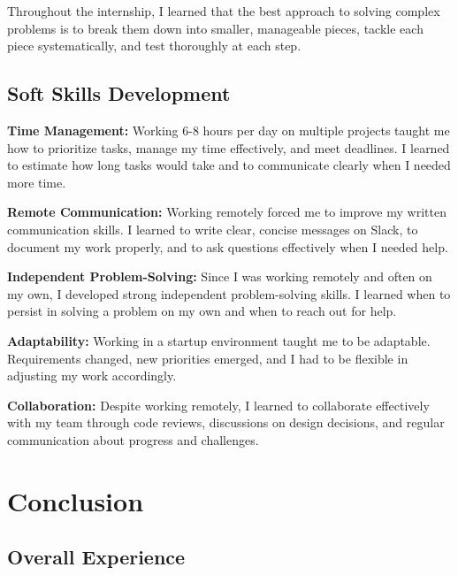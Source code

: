 \documentclass[12pt,a4paper]{report}
\begin{document}
Throughout the internship, I learned that the best approach to solving complex problems is to break them down into smaller, manageable pieces, tackle each piece systematically, and test thoroughly at each step.

\section{Soft Skills Development}

\textbf{Time Management:} Working 6-8 hours per day on multiple projects taught me how to prioritize tasks, manage my time effectively, and meet deadlines. I learned to estimate how long tasks would take and to communicate clearly when I needed more time.

\vspace{0.3cm}

\textbf{Remote Communication:} Working remotely forced me to improve my written communication skills. I learned to write clear, concise messages on Slack, to document my work properly, and to ask questions effectively when I needed help.

\vspace{0.3cm}

\textbf{Independent Problem-Solving:} Since I was working remotely and often on my own, I developed strong independent problem-solving skills. I learned when to persist in solving a problem on my own and when to reach out for help.

\vspace{0.3cm}

\textbf{Adaptability:} Working in a startup environment taught me to be adaptable. Requirements changed, new priorities emerged, and I had to be flexible in adjusting my work accordingly.

\vspace{0.3cm}

\textbf{Collaboration:} Despite working remotely, I learned to collaborate effectively with my team through code reviews, discussions on design decisions, and regular communication about progress and challenges.

\chapter{Conclusion}

\section{Overall Experience}
\end{document}
